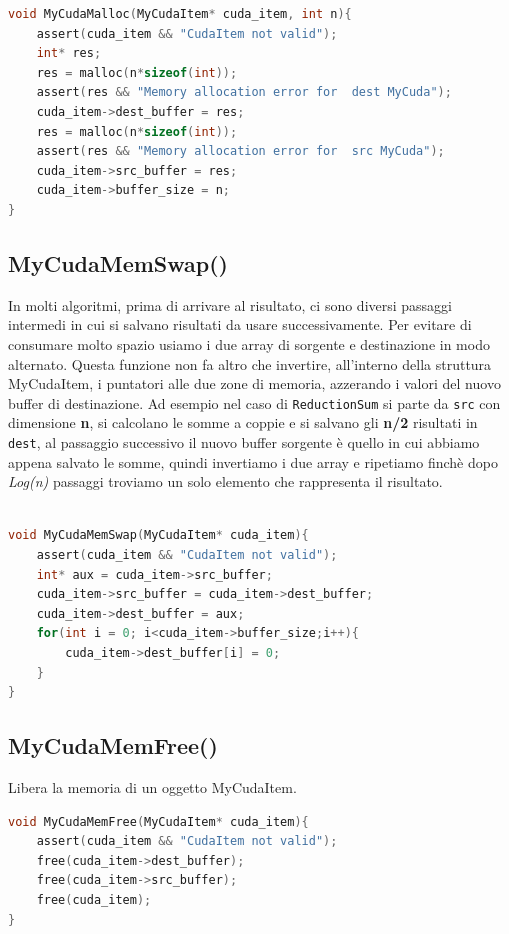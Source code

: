 \documentclass[binding=0.6cm, noexaminfo]{sapthesis}\usepackage{microtype}
\begin{document}
\begin{lstlisting}[language=C]
void MyCudaMalloc(MyCudaItem* cuda_item, int n){
    assert(cuda_item && "CudaItem not valid");
    int* res;
    res = malloc(n*sizeof(int));
    assert(res && "Memory allocation error for  dest MyCuda");
    cuda_item->dest_buffer = res;
    res = malloc(n*sizeof(int));
    assert(res && "Memory allocation error for  src MyCuda");
    cuda_item->src_buffer = res;
    cuda_item->buffer_size = n;
}
\end{lstlisting}

\subsection{MyCudaMemSwap()}
In molti algoritmi, prima di arrivare al risultato, ci sono diversi passaggi intermedi in cui si salvano 
risultati da usare successivamente. Per evitare di consumare molto spazio usiamo i due array di sorgente e 
destinazione in modo alternato. Questa funzione non fa altro che invertire, all'interno della struttura 
MyCudaItem, i puntatori alle due zone di memoria, azzerando i valori del nuovo buffer di destinazione. Ad esempio nel caso di \texttt{ReductionSum} si parte da 
\texttt{src} con dimensione \textbf{n}, si calcolano le somme a coppie e si salvano gli \textbf{n/2}
 risultati in \texttt{dest},
al passaggio successivo il nuovo buffer sorgente è quello in cui abbiamo appena salvato le somme, quindi
invertiamo i due array e ripetiamo finchè dopo \textit{Log(n)} passaggi troviamo un solo elemento che 
rappresenta il risultato.

\begin{lstlisting}[language=C]

void MyCudaMemSwap(MyCudaItem* cuda_item){
    assert(cuda_item && "CudaItem not valid");
    int* aux = cuda_item->src_buffer;
    cuda_item->src_buffer = cuda_item->dest_buffer;
    cuda_item->dest_buffer = aux;
    for(int i = 0; i<cuda_item->buffer_size;i++){
        cuda_item->dest_buffer[i] = 0; 
    }
}
\end{lstlisting}

\subsection{MyCudaMemFree()}

Libera la memoria di un oggetto MyCudaItem. 

\begin{lstlisting}[language=C]
void MyCudaMemFree(MyCudaItem* cuda_item){
    assert(cuda_item && "CudaItem not valid");
    free(cuda_item->dest_buffer);
    free(cuda_item->src_buffer);
    free(cuda_item);
}
\end{lstlisting}
\end{document}
